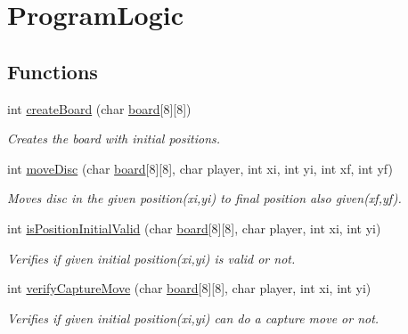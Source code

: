 \hypertarget{group___program_logic}{}\section{Program\+Logic}
\label{group___program_logic}
\subsection*{Functions}
\begin{DoxyCompactItemize}
\item 
int \hyperlink{group___program_logic_ga2838b9e6247aa4515f76cfeccf8e1cd8}{create\+Board} (char \hyperlink{checkers_8c_a12f50bd537a3a737da9d47710c308ae3}{board}\mbox{[}8\mbox{]}\mbox{[}8\mbox{]})
\begin{DoxyCompactList}\small\item\em Creates the board with initial positions. \end{DoxyCompactList}\item 
int \hyperlink{group___program_logic_ga02801d684d1f985fcaff098e12a0bf59}{move\+Disc} (char \hyperlink{checkers_8c_a12f50bd537a3a737da9d47710c308ae3}{board}\mbox{[}8\mbox{]}\mbox{[}8\mbox{]}, char player, int xi, int yi, int xf, int yf)
\begin{DoxyCompactList}\small\item\em Moves disc in the given position(xi,yi) to final position also given(xf,yf). \end{DoxyCompactList}\item 
int \hyperlink{group___program_logic_gaed1b217c7e40a6fb27a0e6a719594aba}{is\+Position\+Initial\+Valid} (char \hyperlink{checkers_8c_a12f50bd537a3a737da9d47710c308ae3}{board}\mbox{[}8\mbox{]}\mbox{[}8\mbox{]}, char player, int xi, int yi)
\begin{DoxyCompactList}\small\item\em Verifies if given initial position(xi,yi) is valid or not. \end{DoxyCompactList}\item 
int \hyperlink{group___program_logic_ga0862e9966f69666bb39dbf1c58863c3b}{verify\+Capture\+Move} (char \hyperlink{checkers_8c_a12f50bd537a3a737da9d47710c308ae3}{board}\mbox{[}8\mbox{]}\mbox{[}8\mbox{]}, char player, int xi, int yi)
\begin{DoxyCompactList}\small\item\em Verifies if given initial position(xi,yi) can do a capture move or not. \end{DoxyCompactList}\item 

\end{DoxyCompactItemize}
